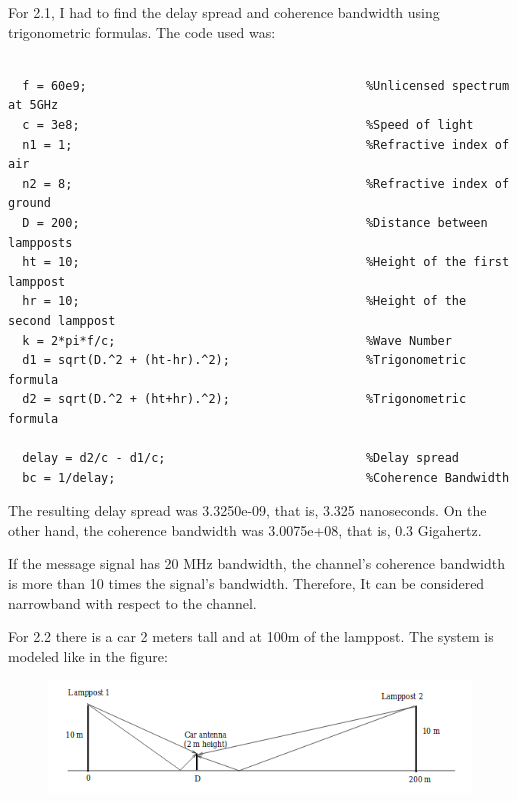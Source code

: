 \documentclass[a4paper,11pt]{article}
\begin{document}
For 2.1, I had to find the delay spread and coherence bandwidth using
trigonometric formulas. The code used was:

\bigskip

\begin{lstlisting}

  f = 60e9;                                       %Unlicensed spectrum at 5GHz
  c = 3e8;                                        %Speed of light
  n1 = 1;                                         %Refractive index of air
  n2 = 8;                                         %Refractive index of ground
  D = 200;                                        %Distance between lampposts
  ht = 10;                                        %Height of the first lamppost
  hr = 10;                                        %Height of the second lamppost
  k = 2*pi*f/c;                                   %Wave Number
  d1 = sqrt(D.^2 + (ht-hr).^2);                   %Trigonometric formula
  d2 = sqrt(D.^2 + (ht+hr).^2);                   %Trigonometric formula

  delay = d2/c - d1/c;                            %Delay spread
  bc = 1/delay;                                   %Coherence Bandwidth

\end{lstlisting}

\bigskip

The resulting delay spread was 3.3250e-09, that is, 3.325 nanoseconds. On the
other hand, the coherence bandwidth was 3.0075e+08, that is, 0.3 Gigahertz.

If the message signal has 20 MHz bandwidth, the channel's coherence bandwidth is
more than 10 times the signal's bandwidth. Therefore, It can be considered
narrowband with respect to the channel.

\newpage

For 2.2 there is a car 2 meters tall and at 100m of the lamppost. The system is
modeled like in the figure:

\begin{figure}[!ht]
	\centering
	\includegraphics[scale = 0.8]{images/figure2.png}
\end{figure}
\end{document}
